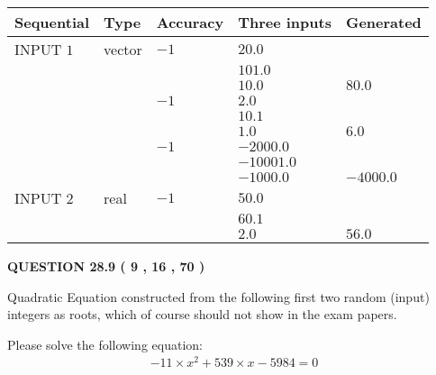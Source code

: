 \documentclass[12pt]{article}
\begin{document}
  
\noindent\begin{tabular}{|l|l|l|l|l|}
\hline
 Sequential & Type & Accuracy & Three inputs & Generated \\ 
\hline
 
 
  INPUT $            1 $ & vector & $           -1  $ & $
20.0
  $ & \\
  & & & $
101.0
  $ & \\
  & & & $
10.0
$ & $ 80.0 $ 
  \\
  & & $           -1  $ & $
2.0
  $ & \\
  & & & $
10.1
  $ & \\
  & & & $
1.0
$ & $ 6.0 $ 
  \\
  & & $           -1  $ & $
-2000.0
  $ & \\
  & & & $
-10001.0
  $ & \\
  & & & $
-1000.0
$ & $ -4000.0 $ 
 \\  \hline  
 
 
  INPUT $            2 $ & real & $           -1  $ & $
 50.0
  $ & \\
  & & &  $
 60.1
  $ & \\
  & & &  $
 2.0
 $ & $ 56.0 $ 
 \\  \hline  
 \end{tabular}
   
   
  
\vspace{0.2in}
  
{\textbf{\Large{QUESTION
28.9 
 (           9 ,          16 ,          70 )
}}}
  
  


\noindent{}
Quadratic Equation constructed from the following first two random (input) integers as roots,  
which of course should not show in the exam papers.  
\noindent{}


 
 

 
Please solve the following equation:
\begin{eqnarray*}
-11 \times x^2  %
+  %
539
                 \times x    %
-5984 =0
\end{eqnarray*}
 
 
 
\noindent{}
 
\end{document}
